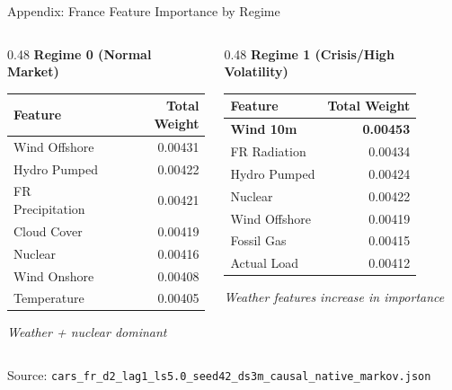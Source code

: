 \documentclass[aspectratio=169]{beamer}
\begin{document}
\begin{frame}{Appendix: France Feature Importance by Regime}
\begin{columns}
\begin{column}{0.48\textwidth}
\textbf{Regime 0 (Normal Market)}
\begin{table}
\scriptsize
\begin{tabular}{l|r}
\toprule
\textbf{Feature} & \textbf{Total Weight} \\
\midrule
Wind Offshore & 0.00431 \\
Hydro Pumped & 0.00422 \\
FR Precipitation & 0.00421 \\
Cloud Cover & 0.00419 \\
Nuclear & 0.00416 \\
Wind Onshore & 0.00408 \\
Temperature & 0.00405 \\
\bottomrule
\end{tabular}
\end{table}
{\tiny \textit{Weather + nuclear dominant}}
\end{column}

\begin{column}{0.48\textwidth}
\textbf{Regime 1 (Crisis/High Volatility)}
\begin{table}
\scriptsize
\begin{tabular}{l|r}
\toprule
\textbf{Feature} & \textbf{Total Weight} \\
\midrule
\textbf{Wind 10m} & \textbf{0.00453} \\
FR Radiation & 0.00434 \\
Hydro Pumped & 0.00424 \\
Nuclear & 0.00422 \\
Wind Offshore & 0.00419 \\
Fossil Gas & 0.00415 \\
Actual Load & 0.00412 \\
\bottomrule
\end{tabular}
\end{table}
{\tiny \textit{Weather features increase in importance}}
\end{column}
\end{columns}

\vspace{0.3cm}
{\scriptsize Source: \texttt{cars\_fr\_d2\_lag1\_ls5.0\_seed42\_ds3m\_causal\_native\_markov.json}}
\end{frame}
\end{document}
